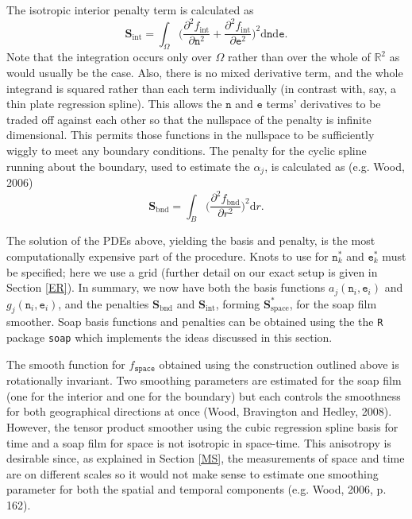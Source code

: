 \documentclass[12pt]{article}
\theoremstyle{definition}
\theoremstyle{plain}
\begin{document}
The isotropic interior penalty term is calculated as
$$
\textbf{S}_\text{int} = \int_\Omega \Big(\frac{\partial^2 f_\text{int}}{\partial \texttt{n}^2}+\frac{\partial^2 f_\text{int}}{\partial \texttt{e}^2} 
\Big)^2\text{d}\texttt{n}\text{d}\texttt{e}.
$$
Note that the integration occurs only over $\Omega$ rather than over the whole of $\mathbb{R}^2$ as would usually be the case. Also, there is no mixed derivative term, and the whole integrand is squared rather than each term individually (in contrast with, say, a thin plate regression spline). This allows the $\texttt{n}$ and $\texttt{e}$ terms' derivatives to be traded off against each other so that the nullspace of the penalty is infinite dimensional. This permits those functions in the nullspace to be sufficiently wiggly to meet any boundary conditions. The penalty for the cyclic spline running about the boundary, used to estimate the $\alpha_j$, is calculated as (e.g. Wood, 2006)
$$
\textbf{S}_\text{bnd} = \int_B \Big(\frac{\partial^2 f_\text{bnd}}{\partial r^2}\Big)^2 \text{d}r.
$$

The solution of the PDEs above, yielding the basis and penalty, is the most computationally expensive part of the procedure. Knots to use for $\texttt{n}_k^*$ and $\texttt{e}_k^*$ must be specified; here we use a grid (further detail on our exact setup is given in Section \ref{ER}). In summary, we now have both the basis functions $a_j(\texttt{n}_i,\texttt{e}_i)$ and $g_j(\texttt{n}_i,\texttt{e}_i)$, and the penalties $\textbf{S}_\text{bnd}$ and $\textbf{S}_\text{int}$, forming $\textbf{S}^*_\text{space}$, for the soap film smoother. Soap basis functions and penalties can be obtained using the the \texttt{R} package \texttt{soap} which implements the ideas discussed in this section.

The smooth function for $f_\texttt{space}$ obtained using the construction outlined above is rotationally invariant. Two smoothing parameters are estimated for the soap film (one for the interior and one for the boundary) but each controls the smoothness for both geographical directions at once (Wood, Bravington and Hedley, 2008). However, the tensor product smoother using the cubic regression spline basis for time and a soap film for space is not isotropic in space-time. This anisotropy is desirable since, as explained in Section \ref{MS}, the measurements of space and time are on different scales so it would not make sense to estimate one smoothing parameter for both the spatial and temporal components (e.g. Wood, 2006, p. 162).
\end{document}
